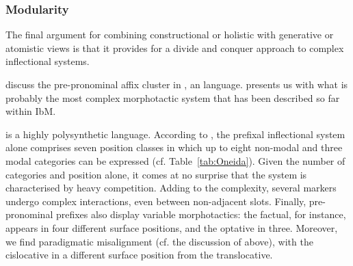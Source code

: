 \documentclass[output=paper
	        ,collection
	        ,collectionchapter
 	        ,biblatex
                ,babelshorthands
                ,newtxmath
                ,draftmode
                ,colorlinks, citecolor=brown
]{langscibook}
\begin{document}
\begin{exe}
\begin{xlist}
\begin{exe}
\begin{xlist}
\subsubsection{Modularity}

The final argument for combining constructional or holistic with
generative or atomistic views is that it provides for a divide and
conquer approach to complex inflectional systems.

\citet{diaz:koenig:michelson:19} discuss the pre-pronominal affix
cluster in , an  language.  presents us with what
is probably the most complex morphotactic system that has been
described so far within IbM.

 is a highly polysynthetic language. According to
\citet{diaz:koenig:michelson:19}, the prefixal inflectional system alone
comprises seven  position classes in which up to eight
non-modal and three modal categories can be expressed
(cf. Table~\ref{tab:Oneida}). Given the number of categories and
position alone, it comes at no surprise that the system is
characterised by heavy competition. Adding to the complexity, several
markers undergo complex interactions, even between non-adjacent slots.
Finally,  pre-pronominal prefixes also display variable
morphotactics: the factual, for instance, appears in four different surface
positions, and the optative in three. Moreover, we find paradigmatic
misalignment (cf. the discussion of  above), with the
cislocative in a different surface position from the translocative.

\begin{table}
  \centering
{}
  \caption{Position classes of Oneida inflectional prefixes
    \citep[435]{diaz:koenig:michelson:19}}
  \label{tab:Oneida}
\end{table}


\end{xlist}
\end{exe}
\end{xlist}
\end{exe}
\end{document}
